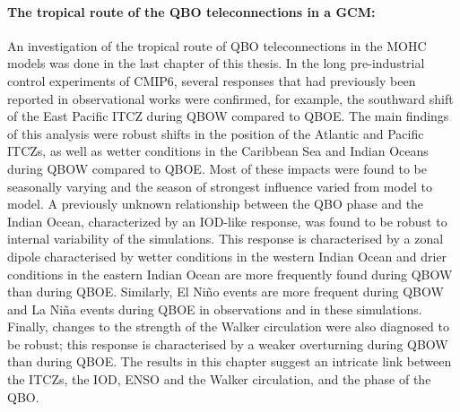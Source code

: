 \paragraph{The tropical route of the QBO teleconnections in a GCM:}
An investigation of the tropical route of QBO teleconnections in the MOHC models was done in the last chapter of this thesis. 
In the long pre-industrial control experiments of CMIP6, several responses that had previously been reported in observational works were confirmed, for example, the southward shift of the East Pacific ITCZ during QBOW compared to QBOE. 
The main findings of this analysis were robust shifts in the position of the Atlantic and Pacific ITCZs, as well as wetter conditions in the Caribbean Sea and Indian Oceans during QBOW compared to QBOE. 
Most of these impacts were found to be seasonally varying and the season of strongest influence varied from model to model. 
A previously unknown relationship between the QBO phase and the Indian Ocean, characterized by an IOD-like response, was found to be robust to internal variability of the simulations. 
This response is characterised by a zonal dipole characterised by wetter conditions in the western Indian Ocean and drier conditions in the eastern Indian Ocean are more frequently found during QBOW than during QBOE. 
Similarly, El Niño events are more frequent during QBOW and La Niña events during QBOE in observations and in these simulations.
Finally, changes to the strength of the Walker circulation were also diagnosed to be robust; this response is characterised by a weaker overturning during QBOW than during QBOE. 
The results in this chapter suggest an intricate link between the ITCZs, the IOD, ENSO and the Walker circulation, and the phase of the QBO. 

